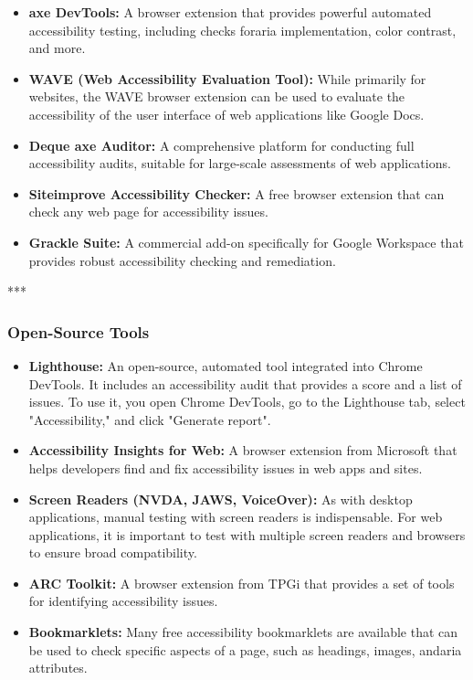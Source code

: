 \begin{itemize}
	\item \textbf{axe DevTools\supercite{AxeDevTools}:} A browser extension that provides powerful automated accessibility testing, including checks for\gls{aria} implementation, color contrast, and more.
	\item \textbf{WAVE (Web Accessibility Evaluation Tool)\supercite{WAVE}:} While primarily for websites, the WAVE browser extension can be used to evaluate the accessibility of the user interface of web applications like Google Docs.
	\item \textbf{Deque axe Auditor\supercite{DequeWorldSpace}:} A comprehensive platform for conducting full accessibility audits, suitable for large-scale assessments of web applications.
	\item \textbf{Siteimprove Accessibility Checker\supercite{SiteimproveAccessibility}:} A free browser extension that can check any web page for accessibility issues.
	\item \textbf{Grackle Suite\supercite{GrackleDocs}:} A commercial add-on specifically for Google Workspace that provides robust accessibility checking and remediation.
\end{itemize}

***

\subsubsection{Open-Source Tools}
\label{sub:open-source-tools-1}

\begin{itemize}
	\item \textbf{Lighthouse\supercite{Lighthouse}:} An open-source, automated tool integrated into Chrome DevTools. It includes an accessibility audit that provides a score and a list of issues. To use it, you open Chrome DevTools, go to the Lighthouse tab, select "Accessibility," and click "Generate report".
	\item \textbf{Accessibility Insights for Web\supercite{AccessibilityInsights}:} A browser extension from Microsoft that helps developers find and fix accessibility issues in web apps and sites.
	\item \textbf{Screen Readers (NVDA, JAWS, VoiceOver):} As with desktop applications, manual testing with screen readers is indispensable. For web applications, it is important to test with multiple screen readers and browsers to ensure broad compatibility.
	\item \textbf{ARC Toolkit\supercite{ARCToolkit}:} A browser extension from TPGi that provides a set of tools for identifying accessibility issues.
	\item \textbf{Bookmarklets\supercite{A11yProject}:} Many free accessibility bookmarklets are available that can be used to check specific aspects of a page, such as headings, images, and\gls{aria} attributes.
\end{itemize}

